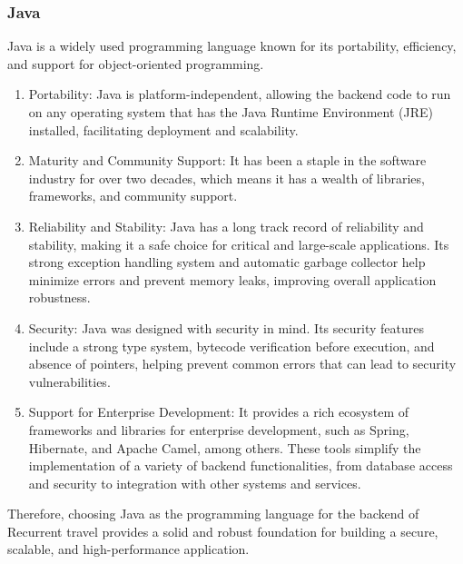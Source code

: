 \documentclass[../memory.tex]{subfiles}
\begin{document}
\subsubsection{Java}
Java is a widely used programming language known for its portability,
efficiency, and support for object-oriented programming.
\begin{enumerate}[label = -]
	\item Portability: Java is platform-independent, allowing the backend code to
	      run on any operating system that has the Java Runtime Environment (JRE)
	      installed, facilitating deployment and scalability.
	\item Maturity and Community Support: It has been a staple in the software
	      industry for over two decades, which means it has a wealth of libraries,
	      frameworks, and community support.
	\item Reliability and Stability: Java has a long track record of reliability
	      and stability, making it a safe choice for critical and large-scale
	      applications. Its strong exception handling system and automatic garbage
	      collector help minimize errors and prevent memory leaks, improving overall
	      application robustness.
	\item Security: Java was designed with security in mind. Its security features
	      include a strong type system, bytecode verification before execution, and
	      absence of pointers, helping prevent common errors that can lead to security
	      vulnerabilities.
	\item Support for Enterprise Development: It provides a rich ecosystem of
	      frameworks and libraries for enterprise development, such as Spring,
	      Hibernate, and Apache Camel, among others. These tools simplify the
	      implementation of a variety of backend functionalities, from database access
	      and security to integration with other systems and services.
\end{enumerate}
Therefore, choosing Java as the programming language for the backend of
Recurrent travel provides a solid and robust foundation for building a secure,
scalable, and high-performance application.
\end{document}
